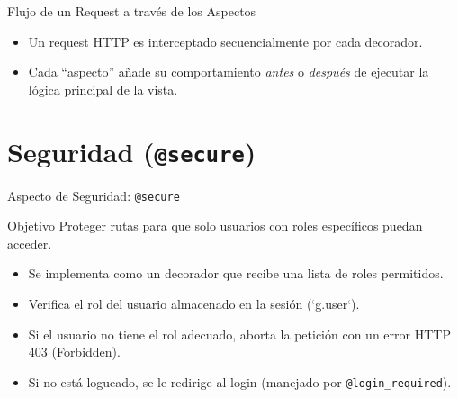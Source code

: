 \documentclass[spanish]{beamer}
\begin{document}
\begin{frame}{Flujo de un Request a través de los Aspectos}
    \centering
    \vfill
    \begin{itemize}
        \item Un request HTTP es interceptado secuencialmente por cada decorador.
        \item Cada ``aspecto'' añade su comportamiento \textit{antes} o \textit{después} de ejecutar la lógica principal de la vista.
    \end{itemize}
\end{frame}

\section{Seguridad (\texttt{@secure})}

\begin{frame}{Aspecto de Seguridad: \texttt{@secure}}
    \begin{block}{Objetivo}
        Proteger rutas para que solo usuarios con roles específicos puedan acceder.
    \end{block}

    \begin{itemize}
        \item Se implementa como un decorador que recibe una lista de roles permitidos.
        \item Verifica el rol del usuario almacenado en la sesión (`g.user`).
        \item Si el usuario no tiene el rol adecuado, aborta la petición con un error HTTP 403 (Forbidden).
        \item Si no está logueado, se le redirige al login (manejado por \texttt{@login\_required}).
    \end{itemize}
\end{frame}
\end{document}
